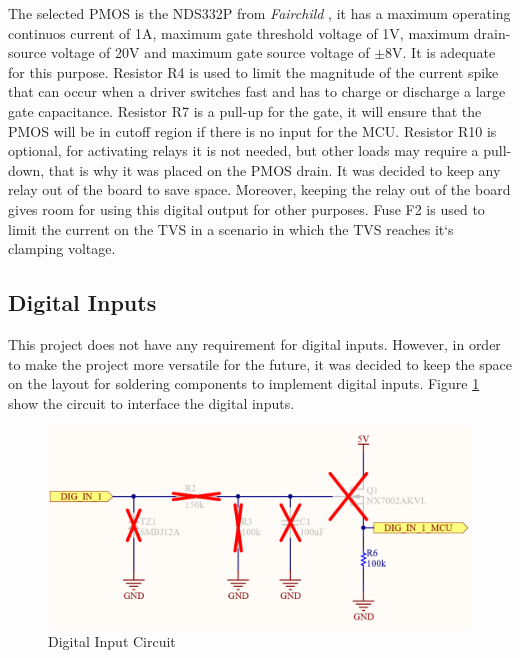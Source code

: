 			The selected PMOS is the NDS332P from \textit{Fairchild} \cite{nds332p-datasheet}, it has a maximum operating continuos current of 1A, maximum gate threshold voltage of 1V, maximum drain-source voltage of 20V and maximum gate source voltage of $\pm$8V. It is adequate for this purpose. Resistor R4 is used to limit the magnitude of the current spike that can occur when a driver switches fast and has to charge or discharge a large gate capacitance. Resistor R7 is a pull-up for the gate, it will ensure that the PMOS will be in cutoff region if there is no input for the MCU. Resistor R10 is optional, for activating relays it is not needed, but other loads may require a pull-down, that is why it was placed on the PMOS drain. It was decided to keep any relay out of the board to save space. Moreover, keeping the relay out of the board gives room for using this digital output for other purposes. Fuse F2 is used to limit the current on the TVS in a scenario in which the TVS reaches it`s clamping voltage.

	\subsection{Digital Inputs}\label{ssec:digital-inputs}

		This project does not have any requirement for digital inputs. However, in order to make the project more versatile for the future, it was decided to keep the space on the layout for soldering components to implement digital inputs. Figure \ref{fig:digital-input-circuit} show the circuit to interface the digital inputs.

			\begin{figure}[htbp]
				\centering
				\includegraphics[scale=0.7]{figuras/fig-digital-input-circuit.png}
				\caption{Digital Input Circuit \cite{digital-input-circuit}}
				\label{fig:digital-input-circuit}
			\end{figure}

